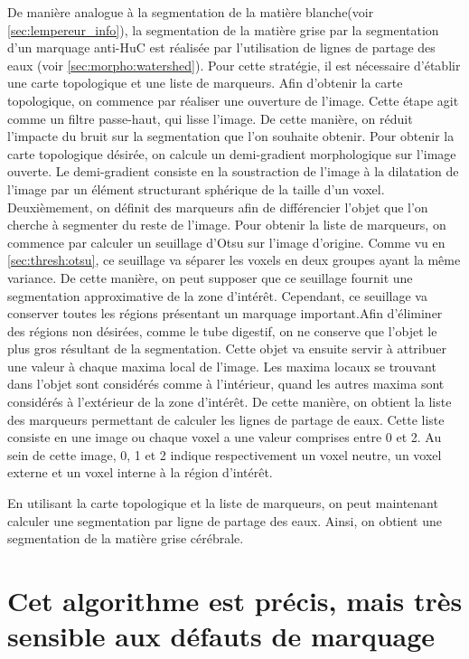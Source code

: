 \documentclass[\main/main.tex]{subfiles}
\begin{document}
De manière analogue à la segmentation de la matière blanche(voir \ref{sec:lempereur_info}), la segmentation de la matière grise par la segmentation d'un marquage anti-HuC est réalisée par l'utilisation de lignes de partage des eaux
(voir \ref{sec:morpho:watershed}). Pour cette stratégie, il est nécessaire d'établir une carte topologique et une liste de marqueurs.
%
Afin d'obtenir la carte topologique, on commence par réaliser une ouverture de l'image. Cette étape agit comme un filtre passe-haut,
qui lisse l'image. De cette manière, on réduit l'impacte du bruit sur la segmentation que l'on souhaite obtenir. Pour obtenir la carte topologique désirée, on calcule un demi-gradient morphologique sur l'image ouverte. Le demi-gradient consiste en la soustraction de l'image à la dilatation de l'image par un élément structurant sphérique de la taille d'un voxel.
Deuxièmement, on définit des marqueurs afin de différencier l'objet que l'on cherche à segmenter du reste de l'image. Pour obtenir la liste de marqueurs, on commence par calculer un seuillage d'Otsu sur l'image d'origine. Comme vu en \ref{sec:thresh:otsu}, ce seuillage va séparer les voxels en deux groupes ayant la même variance. De cette manière, on peut supposer que ce seuillage fournit une segmentation approximative de la zone d'intérêt. Cependant, ce seuillage va conserver toutes les régions présentant un marquage important.Afin d'éliminer des régions non désirées, comme le tube digestif, on ne conserve que l'objet le plus gros résultant de la segmentation.
%
Cette objet va ensuite servir à attribuer une valeur à chaque maxima local de l'image. Les maxima locaux se trouvant dans l'objet sont considérés comme à l'intérieur, quand les autres maxima sont considérés à l'extérieur de la zone d'intérêt. De cette manière, on obtient la liste des marqueurs permettant de calculer les lignes de partage de eaux. Cette liste consiste en une image ou chaque voxel a une valeur comprises entre 0 et 2. Au sein de cette image, 0, 1 et 2 indique respectivement un voxel neutre, un voxel externe et un voxel interne à la région d'intérêt. 

%
En utilisant la carte topologique et la liste de marqueurs, on peut maintenant calculer une segmentation par ligne de partage des eaux. Ainsi, on obtient une segmentation de la matière grise cérébrale.
    
    \section{Cet algorithme est précis, mais très sensible aux défauts de marquage}
    
\end{document}
